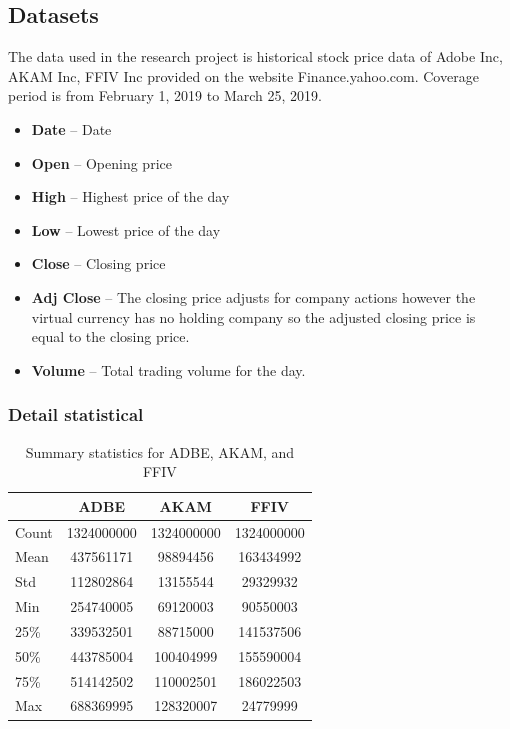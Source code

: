 \documentclass{ieeeojies}
\begin{document}
\subsection{Datasets}
The data used in the research project is historical stock price data of Adobe Inc, AKAM Inc, FFIV Inc provided on the website Finance.yahoo.com. Coverage period is from February 1, 2019 to March 25, 2019.
\begin{itemize}
  \item \textbf{Date} – Date
  \item \textbf{Open} – Opening price
  \item \textbf{High} – Highest price of the day
  \item \textbf{Low} – Lowest price of the day
  \item \textbf{Close} – Closing price
  \item \textbf{Adj Close} – The closing price adjusts for company actions however the virtual currency has no holding company so the adjusted closing price is equal to the closing price.
  \item \textbf{Volume} – Total trading volume for the day.
\end{itemize}
\subsubsection{Detail statistical}
\begin{table}[H]
    \centering
    \begin{tabular}{lccc}
        \toprule
        & \textbf{ADBE} & \textbf{AKAM} & \textbf{FFIV} \\
        \midrule
        Count & 1324000000 & 1324000000 & 1324000000 \\
        Mean & 437561171 & 98894456 & 163434992 \\
        Std & 112802864 & 13155544 & 29329932 \\
        Min & 254740005 & 69120003 & 90550003 \\
        25\% & 339532501 & 88715000 & 141537506 \\
        50\% & 443785004 & 100404999 & 155590004 \\
        75\% & 514142502 & 110002501 & 186022503 \\
        Max & 688369995 & 128320007 & 24779999 \\
        \bottomrule
    \end{tabular}
     \caption{Summary statistics for ADBE, AKAM, and FFIV}
    \label{tab:summary-stats}
\end{table}
\end{document}
